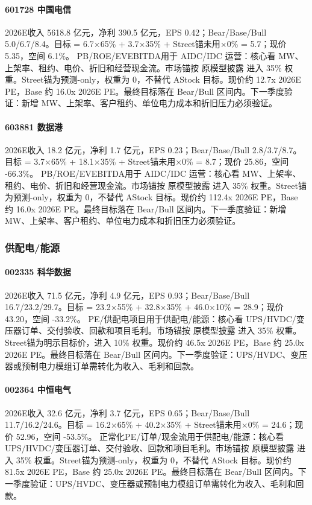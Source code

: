\paragraph{601728 中国电信} 2026E收入 5618.8 亿元，净利 390.5 亿元，EPS 0.42；Bear/Base/Bull 5.0/6.7/8.4。目标 = 6.7×65\% + 3.7×35\% + Street锚未用×0\% = 5.7；现价 5.35，空间 6.1\%。 PB/ROE/EVEBITDA用于 AIDC/IDC 运营：核心看 MW、上架率、租约、电价、折旧和经营现金流。市场锚按 原模型披露 进入 35\% 权重。Street锚为预测-only，权重为 0，不替代 AStock 目标。现价约 12.7x 2026E PE，Base 约 16.0x 2026E PE。最终目标落在 Bear/Bull 区间内。下一季度验证：新增 MW、上架率、客户租约、单位电力成本和折旧压力必须验证。
\paragraph{603881 数据港} 2026E收入 18.2 亿元，净利 1.7 亿元，EPS 0.23；Bear/Base/Bull 2.8/3.7/8.7。目标 = 3.7×65\% + 18.1×35\% + Street锚未用×0\% = 8.7；现价 25.86，空间 -66.3\%。 PB/ROE/EVEBITDA用于 AIDC/IDC 运营：核心看 MW、上架率、租约、电价、折旧和经营现金流。市场锚按 原模型披露 进入 35\% 权重。Street锚为预测-only，权重为 0，不替代 AStock 目标。现价约 112.4x 2026E PE，Base 约 16.0x 2026E PE。最终目标落在 Bear/Bull 区间内。下一季度验证：新增 MW、上架率、客户租约、单位电力成本和折旧压力必须验证。
\subsubsection*{供配电/能源}
\paragraph{002335 科华数据} 2026E收入 71.5 亿元，净利 4.9 亿元，EPS 0.93；Bear/Base/Bull 16.7/23.2/29.7。目标 = 23.2×55\% + 32.8×35\% + 46.0×10\% = 28.9；现价 43.20，空间 -33.2\%。 PE/供配电项目用于供配电/能源：核心看 UPS/HVDC/变压器订单、交付验收、回款和项目毛利。市场锚按 原模型披露 进入 35\% 权重。Street锚为明示目标价，进入 10\% 权重。现价约 46.5x 2026E PE，Base 约 25.0x 2026E PE。最终目标落在 Bear/Bull 区间内。下一季度验证：UPS/HVDC、变压器或预制电力模组订单需转化为收入、毛利和回款。
\paragraph{002364 中恒电气} 2026E收入 32.6 亿元，净利 3.7 亿元，EPS 0.65；Bear/Base/Bull 11.7/16.2/24.6。目标 = 16.2×65\% + 40.2×35\% + Street锚未用×0\% = 24.6；现价 52.96，空间 -53.5\%。 正常化PE/订单/现金流用于供配电/能源：核心看 UPS/HVDC/变压器订单、交付验收、回款和项目毛利。市场锚按 原模型披露 进入 35\% 权重。Street锚为预测-only，权重为 0，不替代 AStock 目标。现价约 81.5x 2026E PE，Base 约 25.0x 2026E PE。最终目标落在 Bear/Bull 区间内。下一季度验证：UPS/HVDC、变压器或预制电力模组订单需转化为收入、毛利和回款。
